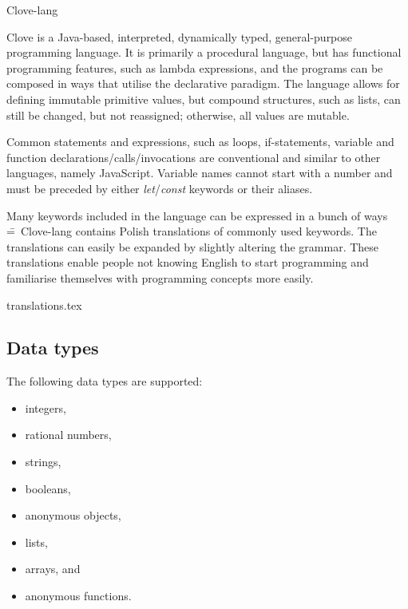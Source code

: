 \documentclass[12pt,a4paper]{article}
\begin{document}
\begin{center}
  \Huge {Clove-lang}
\end{center}

\noindent Clove is a Java-based, interpreted, dynamically typed, general-purpose programming language. It is primarily a procedural language, but has functional programming features, such as lambda expressions, and the programs can be composed in ways that utilise the declarative paradigm. The language allows for defining immutable primitive values, but compound structures, such as lists, can still be changed, but not reassigned; otherwise, all values are mutable.\par

Common statements and expressions, such as loops, if-statements, variable and function declarations/calls/invocations are conventional and similar to other languages, namely JavaScript. Variable names cannot start with a number and must be preceded by either \emph{let}/\emph{const} keywords or their aliases.\par

Many keywords included in the language can be expressed in a bunch of ways \==~Clove-lang contains Polish translations of commonly used keywords. The translations can easily be expanded by slightly altering the grammar. These translations enable people not knowing English to start programming and familiarise themselves with programming concepts more easily.

{translations.tex}



\vspace{-1.75em}
\subsection*{Data types}
The following data types are supported:

\vspace{-0.75em}
\begin{itemize}
  \itemsep-0.25em
  \item integers,
  \item rational numbers,
  \item strings,
  \item booleans,
  \item anonymous objects,
  \item lists,
  \item arrays, and
  \item anonymous functions.
\end{itemize}
\end{document}
